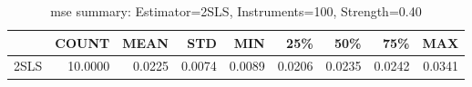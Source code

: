 \begin{table}[ht]
\centering
\caption{mse summary: Estimator=2SLS, Instruments=100, Strength=0.40}
\begin{tabular}{lrrrrrrrr}
\toprule
 & COUNT & MEAN & STD & MIN & 25\% & 50\% & 75\% & MAX \\
\midrule
2SLS & 10.0000 & 0.0225 & 0.0074 & 0.0089 & 0.0206 & 0.0235 & 0.0242 & 0.0341 \\
\bottomrule
\end{tabular}
\end{table}
